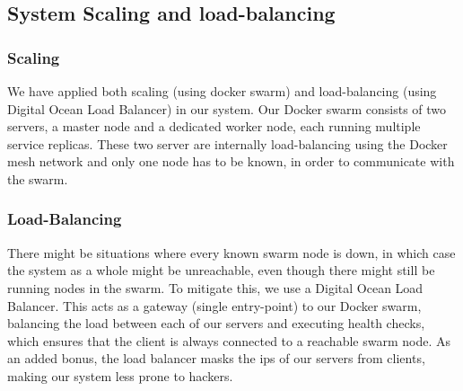 \begin{itemize}
  \subsection{System Scaling and load-balancing}
  \subsubsection{Scaling}
  We have applied both scaling (using docker swarm) and load-balancing (using Digital Ocean Load Balancer) in our system. 
  Our Docker swarm consists of two servers, a master node and a dedicated worker node, each running multiple service replicas. 
  These two server are internally load-balancing using the Docker mesh network and only one node has to be known, in order to communicate with the swarm.

  \subsubsection{Load-Balancing}
  There might be situations where every known swarm node is down, in which case the system as a whole might be unreachable, even though there might still be running nodes in the swarm.
  \newline
  To mitigate this, we use a Digital Ocean Load Balancer. This acts as a gateway (single entry-point) to our Docker swarm, balancing the load between each of our servers and executing health checks, which ensures that the client is always connected to a reachable swarm node.
  \newline
  As an added bonus, the load balancer masks the ips of our servers from clients, making our system less prone to hackers.


\end{itemize}
